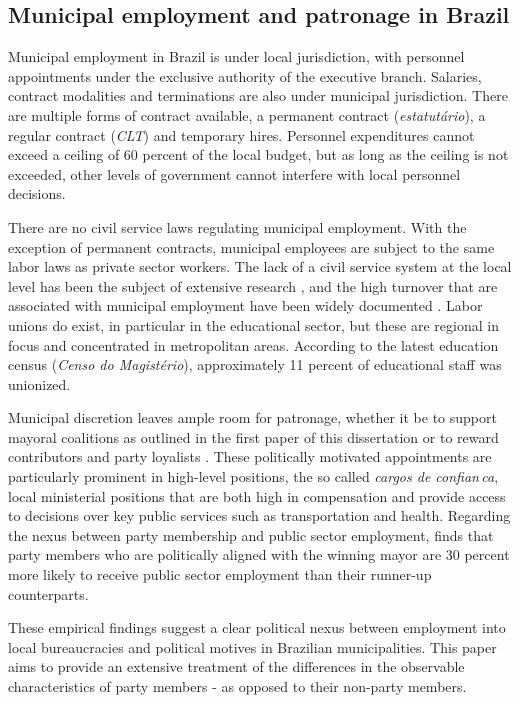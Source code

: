 \documentclass[12pt,a4paper]{article}
\begin{document}
\subsection{Municipal employment and patronage in Brazil}

Municipal employment in Brazil is under local jurisdiction, with personnel appointments under the exclusive authority of the executive branch. Salaries, contract modalities and terminations are also under municipal jurisdiction. There are multiple forms of contract available, a permanent contract (\emph{estatut\'{a}rio}), a regular contract (\emph{CLT}) and temporary hires. Personnel expenditures cannot exceed a ceiling of 60 percent of the local budget, but as long as the ceiling is not exceeded, other levels of government cannot interfere with local personnel decisions.

There are no civil service laws regulating municipal employment. With the exception of permanent contracts, municipal employees are subject to the same labor laws as private sector workers. The lack of a civil service system at the local level has been the subject of extensive research \citep{souza2004governos}, and the high turnover that are associated with municipal employment have been widely documented \citep{akhtari2017political}. Labor unions do exist, in particular in the educational sector, but these are regional in focus and concentrated in metropolitan areas. According to the latest education census (\emph{Censo do Magist\'{e}rio}), approximately 11 percent of educational staff was unionized.

Municipal discretion leaves ample room for patronage, whether it be to support mayoral coalitions as outlined in the first paper of this dissertation or to reward contributors and party loyalists \citep{colonnelli2018patronage,brollo2017victor}. These politically motivated appointments are particularly prominent in high-level positions, the so called \emph{cargos de confian\,{c}a}, local ministerial positions that are both high in compensation and provide access to decisions over key public services such as transportation and health. Regarding the nexus between party membership and public sector employment, \citet{brollo2017victor} finds that party members who are politically aligned with the winning mayor are 30 percent more likely to receive public sector employment than their runner-up counterparts.

These empirical findings suggest a clear political nexus between employment into local bureaucracies and political motives in Brazilian municipalities. This paper aims to provide an extensive treatment of the differences in the observable characteristics of party members - as opposed to their non-party members.
\end{document}
